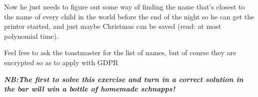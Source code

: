 Now he just needs to figure out some way of finding
the name that's closest to the name of every child in the world before the end
of the night so he can get the printer started, and just maybe Christmas can be
saved (read: at most polynomial time).

Feel free to ask the toastmaster for the list of names, but of course they are encrypted so as to apply with GDPR

\vspace{0.5em}\textbf{\emph{NB:\@ The first to solve this exercise and turn in
a correct solution in the bar will win a bottle of homemade schnapps!}}
